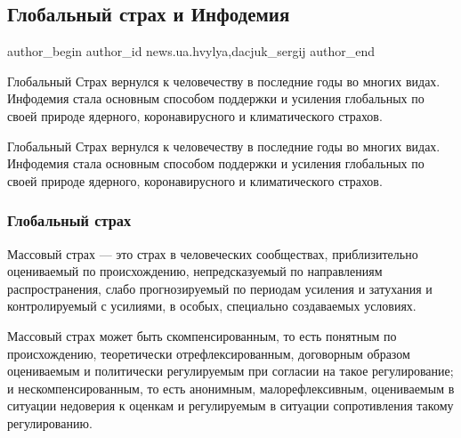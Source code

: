  
 
 
 
 
\subsection{Глобальный страх и Инфодемия}
\label{sec:12_01_2022.stz.news.ua.hvylya.1.globalnyj_strah_infodemia}

\ifcmt
 author_begin
   author_id news.ua.hvylya,dacjuk_sergij
 author_end
\fi

\begin{zznagolos}
Глобальный Страх вернулся к человечеству в последние годы во многих видах.
Инфодемия стала основным способом поддержки и усиления глобальных по своей
природе ядерного, коронавирусного и климатического страхов.	
\end{zznagolos}

Глобальный Страх вернулся к человечеству в последние годы во многих видах.
Инфодемия стала основным способом поддержки и усиления глобальных по своей
природе ядерного, коронавирусного и климатического страхов.

\subsubsection{Глобальный страх}

Массовый страх — это страх в человеческих сообществах, приблизительно
оцениваемый по происхождению, непредсказуемый по направлениям распространения,
слабо прогнозируемый по периодам усиления и затухания и контролируемый с
усилиями, в особых, специально создаваемых условиях.


Массовый страх может быть скомпенсированным, то есть понятным по происхождению,
теоретически отрефлексированным, договорным образом оцениваемым и политически
регулируемым при согласии на такое регулирование; и нескомпенсированным, то
есть анонимным, малорефлексивным, оцениваемым в ситуации недоверия к оценкам и
регулируемым в ситуации сопротивления такому регулированию.

